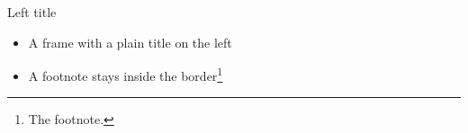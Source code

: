 \begin{standardframe}{Left title}
	\begin{itemize}
		\item A frame with a plain title on the left
		\item A footnote stays inside the border\footnote{The footnote.}
	\end{itemize}
\end{standardframe}
